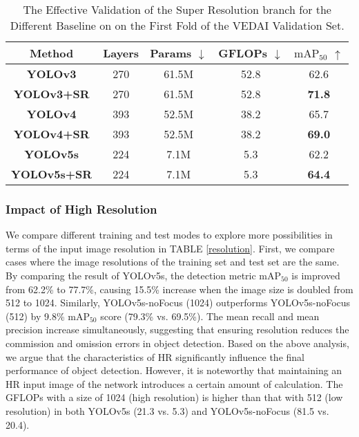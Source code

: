  \begin{table}[htpb]
	\small
	\centering
	{\caption{The Effective Validation of  the Super Resolution branch for the Different  Baseline on on the First Fold of the VEDAI Validation Set.}
	\label{ablationsr}
	\begin{tabular}{c|c|c|c|c}
		\toprule[1.2pt]
        \textbf{Method} & \textbf{Layers} & \textbf{Params} $\downarrow$ & \textbf{GFLOPs} $\downarrow$ & \textbf{$\text{mA}{{\text{P}}_{\text{50}}}$} $\uparrow$ \\
		\midrule
		\textbf{YOLOv3}     & 270 & 61.5M & 52.8 & 62.6 \\
		\textbf{YOLOv3+SR}  & 270 & 61.5M & 52.8 & \textbf{71.8} \\
		\midrule
		\textbf{YOLOv4}     & 393 & 52.5M & 38.2 & 65.7 \\
		\textbf{YOLOv4+SR}  & 393 & 52.5M & 38.2 & \textbf{69.0} \\
		\midrule
		\textbf{YOLOv5s}    & 224 & 7.1M  & 5.3  & 62.2 \\
		\textbf{YOLOv5s+SR} & 224 & 7.1M  & 5.3  & \textbf{64.4}   \\ 
		\bottomrule[1.2pt]                                     
	\end{tabular}}
\vspace{-0.1in}
\end{table}


 









\subsubsection{\textbf{Impact of High Resolution}}
We compare different training and test modes to explore more possibilities in terms of the input image resolution in TABLE \ref{resolution}. First, we compare cases where the image resolutions of the training set and test set are the same.
By comparing the result of YOLOv5s, the detection metric $\text{mA}{{\text{P}}_{\text{50}}}$ is improved from 62.2\% to 77.7\%, causing 15.5\% increase  when the image size is doubled from 512 to 1024. Similarly, YOLOv5s-noFocus (1024) outperforms YOLOv5s-noFocus (512) by 9.8\% $\text{mA}{{\text{P}}_{\text{50}}}$ score (79.3\% vs. 69.5\%). The mean recall and mean precision increase simultaneously, suggesting that ensuring resolution reduces the commission and omission errors in object detection. Based on the above analysis, we argue that the characteristics of HR significantly influence the final performance of object detection. However, it is noteworthy that maintaining an HR input image of the network introduces a certain amount of calculation. The GFLOPs with a size of 1024 (high resolution) is higher than that with 512 (low resolution) in both YOLOv5s (21.3 vs. 5.3) and YOLOv5s-noFocus (81.5 vs. 20.4). 


